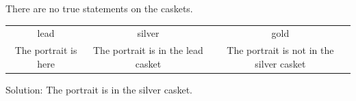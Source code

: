 There are no true statements on the caskets.
\begin{tabular}{ccc}
\toprule
lead & silver & gold\\
The portrait is here & The portrait is in the lead casket & The portrait is not in the silver casket\\
\bottomrule
\end{tabular}
Solution: The portrait is in the silver casket.